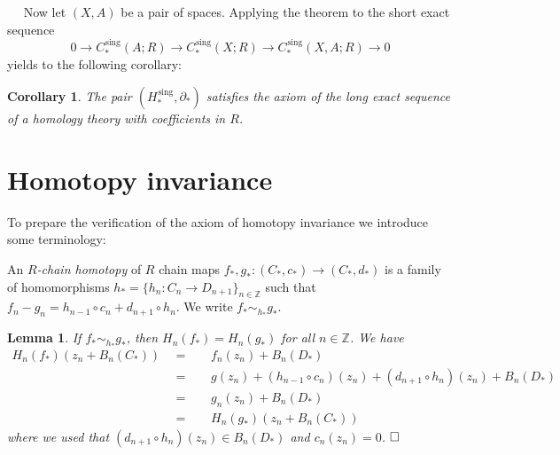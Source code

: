 \documentclass[11pt]{book}
\numberwithin{dummy}{section}
\newtheorem{lemma}[theorem]{Lemma}
\newtheorem{corollary}[theorem]{Corollary}
\theoremstyle{nonumberbreak}
\newenvironment{defin}[1][]{\ifthenelse{\equal{#1}{}}{\definition}{\definition[#1]}\rm}{\enddefinition}
\newenvironment{pr}[1][]{\ifthenelse{\equal{#1}{}}{\proof}{\proof[#1]}\rm}{\endproof}
\newcommand{\la}{\longrightarrow}
\newcommand{\Z}{\mathbb{Z}}
\newcommand{\Cs}{C^{\hspace{1pt}\mathrm{sing}}}
\newcommand{\Hs}{H^{\hspace{1pt}\mathrm{sing}}}
\begin{document}
\begin{spacing}{1.4}
$\quad$ Now let $(X,A)$ be a pair of spaces. Applying the theorem to the short exact sequence
$$0 \la \Cs_*(A;R) \la \Cs_*(X;R) \la \Cs_*(X,A;R) \la 0$$
yields to the following corollary:

\begin{corollary}
The pair $(\Hs_*, \partial_*)$ satisfies the axiom of the long exact sequence of a homology theory with coefficients in $R$.

\end{corollary}




























\section{Homotopy invariance} %


To prepare the verification of the axiom of homotopy invariance we introduce some terminology:

\begin{defin}
An $R$\textit{-chain homotopy} of $R$ chain maps $f_*, g_*: (C_*, c_*) \la (C_*, d_*)$ is a family of homomorphisms
$h_*=\{h_n:C_n \la D_{n+1} \}_{n \in \Z}$ such that $f_n - g_n = h_{n-1} \circ c_n + d_{n+1} \circ h_n$. We write $f_* \sim_{h_*} g_*$.

\end{defin}



\begin{lemma}
If $f_* \sim_{h_*} g_*$, then $H_n(f_*) = H_n(g_*)$ for all $n \in \Z$. 
\begin{pr}
We have
\begin{alignat*}{5}
H_n(f_*)(z_n+ B_n(C_*)) \ \ &=&& \ \ f_n(z_n) + B_n(D_*) \\
&=&& \ \ g(z_n) + (h_{n-1} \circ c_n)(z_n) + (d_{n+1} \circ h_n)(z_n) + B_n(D_*) \\
&=&& \ \ g_n(z_n) + B_n(D_*) \\
&=&& \ \ H_n(g_*)(z_n + B_n(C_*))
\end{alignat*}
where we used that $(d_{n+1} \circ h_n)(z_n) \in B_n(D_*)$ and $c_n(z_n) = 0$. $\hfill \Box$


\end{pr}
\end{lemma}
\end{spacing}
\end{document}
